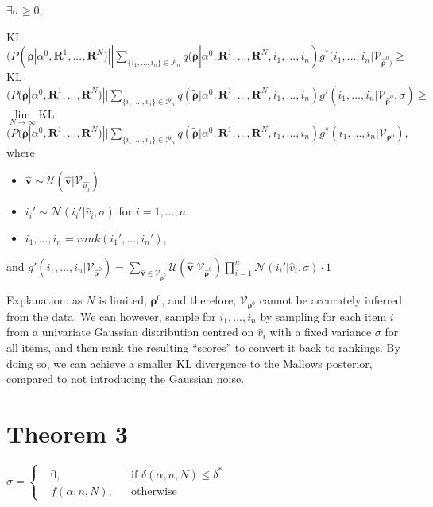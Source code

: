\documentclass[11pt, oneside]{article}   	%
\begin{document}
$\exists\sigma \geq 0$,

 KL $(P(\bm{\rho}|\alpha^0, \bm{R}^1, ...,\bm{R}^N ) || \sum\limits_{\{i_1,..., i_n\} \in \mathcal{P}_n} q (\tilde{\bm{\rho}}|\alpha^0, \bm{R}^1,..., \bm{R}^N, i_1,...,i_n) g^{*}(i_1,...,i_n|\mathcal{V}_{\hat{\bm{\rho}}^0)}\geq $\\
 KL $(P(\bm{\rho}|\alpha^0, \bm{R}^1, ...,\bm{R}^N ) || \sum\limits_{\{i_1,..., i_n\} \in \mathcal{P}_n} q (\tilde{\bm{\rho}}|\alpha^0, \bm{R}^1,..., \bm{R}^N, i_1,...,i_n) g'(i_1,...,i_n|\mathcal{V}_{\hat{\bm{\rho}}^0}, \sigma)\geq $\\
 $\lim\limits_{N\rightarrow \infty}$KL $(P(\bm{\rho}|\alpha^0, \bm{R}^1, ...,\bm{R}^N ) || \sum\limits_{\{i_1,..., i_n\} \in \mathcal{P}_n} q (\tilde{\bm{\rho}}|\alpha^0, \bm{R}^1,..., \bm{R}^N, i_1,...,i_n) g^{*}(i_1,...,i_n|{\mathcal{V}_{\bm{\rho}^0}}), $\\
 where 
 \begin{itemize}
 	\item {$\hat{\bm{v}} \sim \mathcal{U} (\hat{\bm{v}}|\mathcal{V}_{\hat{\rho_{0}}})$}
  	\item {$i_i'\sim \mathcal{N}(i_i'|\hat{v}_i, \sigma)$} for $i = 1,...,n $
 	\item {$i_1, ..., i_n = rank(i_1', ..., i_n')$},
 \end{itemize}
and
 	$g'(i_1, ..., i_n|\mathcal{V}_{\hat{\bm{\rho}}^0}) = \sum\limits_{\hat{\bm{v}}\in \mathcal{V}_{\hat{\bm{\rho}}^0}} \mathcal{U} (\hat{\bm{v}}|\mathcal{V}_{\hat{\bm{\rho}}^{0}})\prod\limits_{i=1}^{n}\mathcal{N}(i_i'|\hat{v}_i, \sigma)\cdot {1}$
 	
 
 Explanation: as $N$ is limited, $\bm{\rho}^0$, and therefore, $\mathcal{V}_{\bm{\rho}^0}$ cannot be accurately inferred from the data. We can however, sample for $i_1, ..., i_n$ by sampling for each item $i$ from a univariate Gaussian distribution centred on $\hat{v}_i$ with a fixed variance $\sigma$ for all items, and then rank the resulting ``scores'' to convert it back to rankings. By doing so, we can achieve a smaller KL divergence to the Mallows posterior, compared to not introducing the Gaussian noise.
 
\section{Theorem 3}
 $
\sigma = \left \{
\begin{aligned}
&0, && \text{if } \delta(\alpha,n,N)\leq \delta ^{*} \\
&f(\alpha, n,N), && \text{otherwise}
\end{aligned} \right.
$
\end{document}
